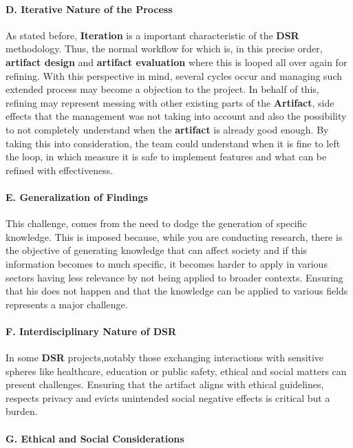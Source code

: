 \paragraph{D. Iterative Nature of the Process}\mbox{}

As stated before, \textbf{Iteration} is a important characteristic of the \textbf{DSR} methodology. Thus, the normal workflow for which is, in this precise order, \textbf{artifact design} and \textbf{artifact evaluation} where this is looped all over again for refining. With this perspective in mind, several cycles occur and managing such extended process may become a objection to the project. In behalf of this, refining may represent messing with other existing parts of the \textbf{Artifact}, side effects that the management was not taking into account and also the possibility to not completely understand when the \textbf{artifact} is already good enough. By taking this into consideration, the team could understand when it is fine to left the loop, in which measure it is safe to implement features and what can be refined with effectiveness.

\paragraph{E. Generalization of Findings}\mbox{}

This challenge, comes from the need to dodge the generation of specific knowledge. This is imposed because, while you are conducting research, there is the objective of generating knowledge that can affect society and if this information becomes to much specific, it becomes harder to apply in various sectors having less relevance by not being applied to broader contexts. Ensuring that his does not happen and that the knowledge can be applied to various fields represents a major challenge.


\paragraph{F. Interdisciplinary Nature of DSR}\mbox{}

In some \textbf{DSR} projects,notably those exchanging interactions with sensitive spheres like healthcare, education or public safety, ethical and social matters can present challenges. Ensuring that the artifact aligns with ethical guidelines, respects privacy and evicts unintended social negative effects is critical but a burden.

\paragraph{G.  Ethical and Social Considerations}\mbox{}


